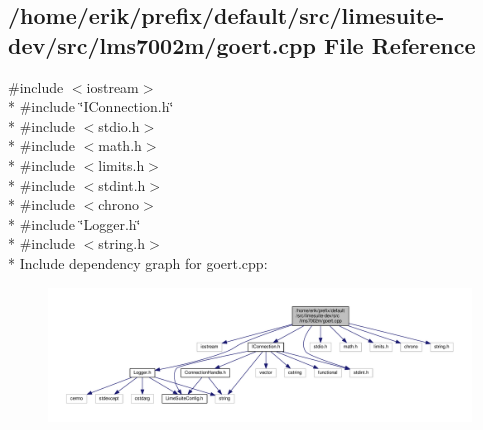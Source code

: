 \subsection{/home/erik/prefix/default/src/limesuite-\/dev/src/lms7002m/goert.cpp File Reference}
\label{goert_8cpp}
{\ttfamily \#include $<$iostream$>$}\\*
{\ttfamily \#include \char`\"{}I\+Connection.\+h\char`\"{}}\\*
{\ttfamily \#include $<$stdio.\+h$>$}\\*
{\ttfamily \#include $<$math.\+h$>$}\\*
{\ttfamily \#include $<$limits.\+h$>$}\\*
{\ttfamily \#include $<$stdint.\+h$>$}\\*
{\ttfamily \#include $<$chrono$>$}\\*
{\ttfamily \#include \char`\"{}Logger.\+h\char`\"{}}\\*
{\ttfamily \#include $<$string.\+h$>$}\\*
Include dependency graph for goert.\+cpp\+:
\nopagebreak
\begin{figure}[H]
\begin{center}
\leavevmode
\includegraphics[width=350pt]{de/d13/goert_8cpp__incl}
\end{center}
\end{figure}
